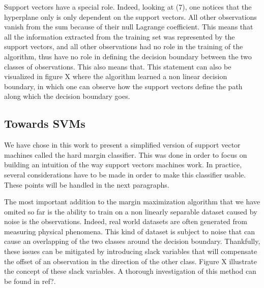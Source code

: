 Support vectors have a special role. Indeed, looking at (7), one notices that the hyperplane only is only dependent on the support vectors. All other observations vanish from the sum because of their null Lagrange coefficient. This means that all the information extracted from the training set was represented by the support vectors, and all other observations had no role in the training of the algorithm, thus have no role in defining the decision boundary between the two classes of observations. This also means that. This statement can also be visualized in figure X where the algorithm learned a non linear decision boundary, in which one can observe how the support vectors define the path along which the decision boundary goes.

\subsection{Towards SVMs}

We have chose in this work to present a simplified version of support vector machines called the hard margin classifier. This was done in order to focus on building an intuition of the way support vectors machines work. In practice, several considerations have to be made in order to make this classifier usable. These points will be handled in the next paragraphs.

The most important addition to the margin maximization algorithm that we have omited so far is the ability to train on a non linearly separable dataset caused by noise is the observations. Indeed, real world datasets are often generated from measuring physical phenomena. This kind of dataset is subject to noise that can cause an overlapping of the two classes around the decision boundary. Thankfully, these issues can be mitigated by introducing slack variables that will compensate the offset of an observation in the direction of the other class. Figure X illustrate the concept of these slack variables. A thorough investigation of this method can be found in  \textcolor[rgb]{1,0,0}{ref?}.

\iffalse
\begin{tikzpicture}[domain=0:3]
\begin{axis}[xlabel={$T_{\text{meas}}$}, ylabel={$T_{\text{cal}}$}]
\addplot[scatter, only marks, scatter src=\thisrow{class},
      error bars/.cd, y dir=both, x dir=both, y explicit, x explicit, error bar style={color=mapped color}]
      table[x=x,y=y,x error=xerr,y error=yerr] {
    x       xerr    y        yerr       class
    0.98521 0.00031 1        0.000001   0
    0.49238 0.00044 0.5      0.00000025 0
    1.09346 0.00032 1.111111 0.0000012  0
    1.23021 0.00078 1.25     0.0000016  0
    1.40567 0.00047 1.428571 0.000002   0
    1.63971 0.00064 1.666667 0.0000028  0
    1.96753 0.00063 2        0.000004   0
};
\end{axis}
\end{tikzpicture}
\fi

